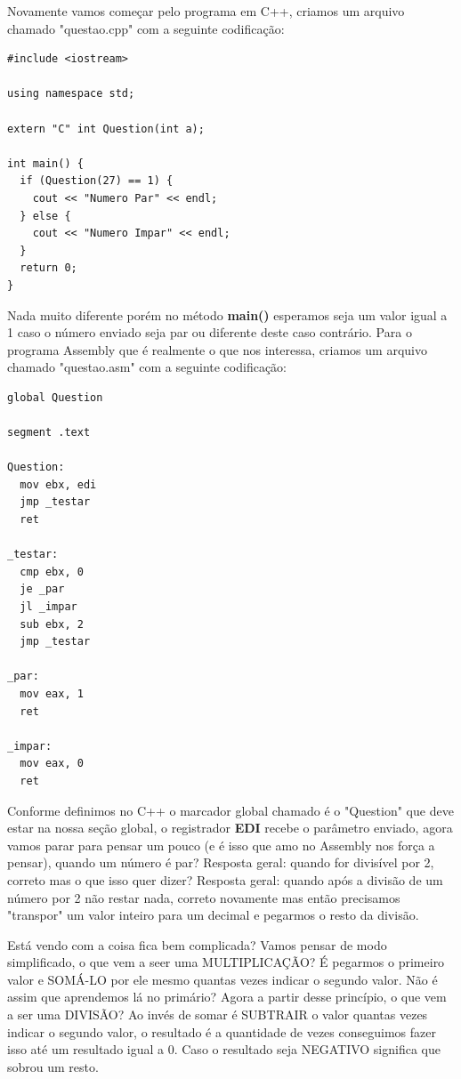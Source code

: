 Novamente vamos começar pelo programa em C++, criamos um arquivo chamado "questao.cpp" com a seguinte codificação:
\begin{lstlisting}[]
#include <iostream>

using namespace std;

extern "C" int Question(int a);

int main() {
  if (Question(27) == 1) {
	cout << "Numero Par" << endl;
  } else {
	cout << "Numero Impar" << endl;
  }
  return 0;
}	
\end{lstlisting}

Nada muito diferente porém no método \textbf{main()} esperamos seja um valor igual a 1 caso o número enviado seja par ou diferente deste caso contrário. Para o programa Assembly que é realmente o que nos interessa, criamos um arquivo chamado "questao.asm" com a seguinte codificação:
\begin{lstlisting}[]
global Question

segment .text

Question:
  mov ebx, edi
  jmp _testar
  ret

_testar:
  cmp ebx, 0
  je _par
  jl _impar
  sub ebx, 2
  jmp _testar	

_par:
  mov eax, 1
  ret

_impar:
  mov eax, 0
  ret
\end{lstlisting}

Conforme definimos no C++ o marcador global chamado é o "Question" que deve estar na nossa seção global, o registrador \textbf{EDI} recebe o parâmetro enviado, agora vamos parar para pensar um pouco (e é isso que amo no Assembly nos força a pensar), quando um número é par? Resposta geral: quando for divisível por 2, correto mas o que isso quer dizer? Resposta geral: quando após a divisão de um número por 2 não restar nada, correto novamente mas então precisamos "transpor" um valor inteiro para um decimal e pegarmos o resto da divisão.

Está vendo com a coisa fica bem complicada? Vamos pensar de modo simplificado, o que vem a seer uma MULTIPLICAÇÃO? É pegarmos o primeiro valor e SOMÁ-LO por ele mesmo quantas vezes indicar o segundo valor. Não é assim que aprendemos lá no primário? Agora a partir desse princípio, o que vem a ser uma DIVISÃO? Ao invés de somar é SUBTRAIR o valor quantas vezes indicar o segundo valor, o resultado é a quantidade de vezes conseguimos fazer isso até um resultado igual a 0. Caso o resultado seja NEGATIVO significa que sobrou um resto. 


